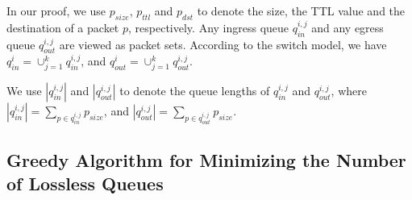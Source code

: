 In our proof, we use $p_{size}$, $p_{ttl}$ and $p_{dst}$ to denote the size, the TTL value and the destination of a packet $p$, respectively. Any ingress queue $q_{in}^{i,j}$ and any egress queue $q_{out}^{i,j}$ are viewed as packet sets. According to the switch model, we have $q_{in}^{i}=\cup_{j=1}^{k}q_{in}^{i,j}$, and $q_{out}^{i}=\cup_{j=1}^{k}q_{out}^{i,j}$.

We use $|q_{in}^{i,j}|$ and $|q_{out}^{i,j}|$ to denote the queue lengths of $q_{in}^{i,j}$ and $q_{out}^{i,j}$, where $|q_{in}^{i,j}|=\sum_{p\in q_{in}^{i,j}}p_{size}$, and $|q_{out}^{i,j}|=\sum_{p\in q_{out}^{i,j}}p_{size}$.
\fi


\subsection{Greedy Algorithm for Minimizing the Number of Lossless Queues}

